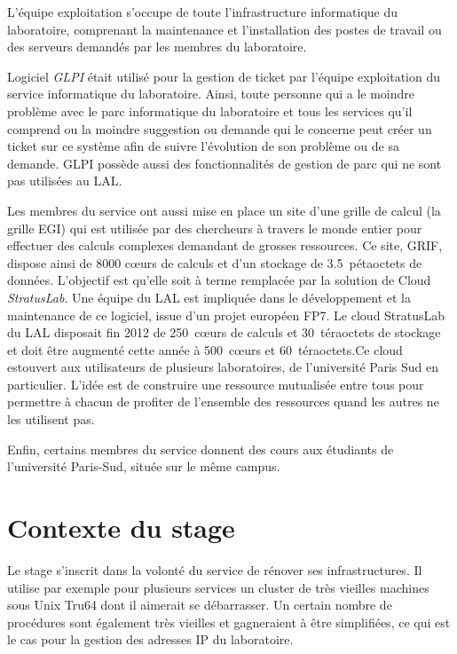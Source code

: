 \documentclass[12pt,a4paper,twoside]{report}
\begin{document}
L’équipe exploitation s’occupe de toute l’infrastructure informatique du
laboratoire, comprenant la maintenance et l’installation des postes de travail
ou des serveurs demandés par les membres du laboratoire.

Logiciel \emph{GLPI} était utilisé pour la gestion de ticket
par l’équipe exploitation du service informatique du laboratoire. Ainsi, toute
personne qui a le moindre problème avec le parc informatique du laboratoire et
tous les services qu’il comprend ou la moindre suggestion ou demande qui le
concerne peut créer un ticket sur ce système afin de suivre l’évolution de son
problème ou de sa demande.  GLPI possède aussi des fonctionnalités de gestion
de parc qui ne sont pas utilisées au LAL.

Les membres du service ont aussi mise en place un site d'une grille de
calcul (la grille EGI) qui est utilisée par des chercheurs à travers le monde entier pour
effectuer des calculs complexes demandant de grosses ressources. Ce site, GRIF, dispose
ainsi de 8000 cœurs de calculs et d’un stockage de 3.5~pétaoctets de données.
L’objectif est qu’elle soit à terme remplacée par la solution de Cloud \emph{StratusLab}.
Une équipe du LAL est impliquée dans le développement et la maintenance de ce
logiciel, issue d'un projet européen FP7.
Le cloud StratusLab du LAL disposait fin 2012 de
250~cœurs de calculs et 30~téraoctets de stockage et doit être augmenté cette
année à 500~cœurs et 60~téraoctets.Ce cloud estouvert aux utilisateurs de plusieurs
laboratoires, de l'université Paris Sud en particulier. L'idée est de construire une ressource
mutualisée entre tous pour permettre à chacun de profiter de l'ensemble des ressources
quand les autres ne les utilisent pas.

Enfin, certains membres du service donnent des cours aux étudiants de
l’université Paris-Sud, située sur le même campus.

\section{Contexte du stage}
\label{sec:context}

Le stage s’inscrit dans la volonté du service de rénover ses
infrastructures. Il utilise par exemple pour plusieurs services un cluster de
très vieilles machines sous Unix Tru64 dont il aimerait se débarrasser. Un certain
nombre de procédures sont également très vieilles et gagneraient à être
simplifiées, ce qui est le cas pour la gestion des adresses IP du laboratoire.
\end{document}
